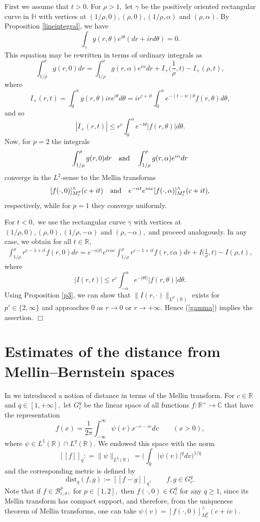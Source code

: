 \documentclass[amsmath,english,a4paper,graphicx,12pt]{article}
\begin{document}
First we assume that $t>0.$ For $\rho >1,$ let $\gamma$ be the positively oriented rectangular curve in $\mathbb{H}$ with vertices at 
$(1/\rho, 0), (\rho, 0), (1/\rho, \alpha)$ and $(\rho, \alpha).$ By Proposition \ref{lineintegral}, we have
$$\int_\gamma g(r,\theta) e^{i\theta}(dr + ird\theta) = 0.$$
This equation may be rewritten in terms of ordinary integrals as
$$\int_{1/\rho}^\rho g(r,0)dr = \int_{1/\rho}^\rho g(r,\alpha) e^{i\alpha}dr + I_+\bigg(\frac{1}{\rho}, t\bigg) - I_+(\rho, t),$$
where
$$I_+(r,t) = \int_0^\alpha g(r,\theta)i r e^{i\theta}d\theta = i r^{c+it}\int_0^\alpha e^{-(t-ic)\theta}f(r, \theta)d\theta,$$
and so 
$$|I_+(r,t)| \leq r^c\int_0^\alpha e^{-t \theta}|f(r,\theta)| d\theta.$$
Now, for $p=2$ the integrals
$$\int_{1/\rho}^\rho g(r,0)dr \quad\hbox{and} \quad \int_{1/\rho}^\rho g(r,\alpha) e^{i\alpha}dr$$
converge in the $L^2$-sense to the Mellin transforms 
$$[f(\cdot, 0)]^\wedge_{M^p_c}(c+it)  \quad \hbox{and} \quad 
e^{-\alpha t} e^{i \alpha c}[f(\cdot, \alpha)]^\wedge_{M^p_c}(c+it),$$ 
respectively, while for $p=1$ they converge uniformly.

 For $t<0,$ we use the rectangular curve $\gamma$ with vertices at $(1/\rho, 0), (\rho, 0), (1/\rho, -\alpha)$ and $(\rho, -\alpha),$ and 
proceed analogously. In any case, we obtain for all $t \in \mathbb{R},$
\begin{eqnarray}\label{gamma}
\int_{1/\rho}^{\rho} r^{c-1+it}f(r,0)dr = e^{-\alpha |t|} e^{i\varepsilon \alpha c}\int_{1/\rho}^\rho r^{c-1+it}f(r, \varepsilon \alpha) dr + 
I\bigg(\frac{1}{\rho}, t\bigg) - I(\rho, t),
\end{eqnarray}
where
$$|I(r,t)| \leq r^c\int_{-\alpha}^\alpha e^{-|\theta t|}|f(r, \theta)| d\theta.$$
Using Proposition \ref{p3}, we can show that $\|I(r, \cdot)\|_{L^{p'}(\mathbb{R})}$ exists for $p' \in \{2, \infty\}$ and approaches $0$ as 
$r \rightarrow 0$ or $r \rightarrow +\infty.$ Hence (\ref{gamma}) implies the assertion. \hfill $\Box$

\section{Estimates of the distance from Mellin--Bernstein spaces}

In \cite{BBMS2} we introduced a notion of distance in terms of the Mellin transform. For $c \in \mathbb{R}$ and $q \in [1, +\infty],$ let $G^q_c$ 
be the linear space of all functions $f:\mathbb{R}^+\rightarrow \mathbb{C}$ that have the representation
$$f(x) = \frac{1}{2\pi}\int_{-\infty}^\infty \psi(v) x^{-c-iv}dv \qquad (x>0),$$
where $\psi \in L^1(\mathbb{R})\cap L^q(\mathbb{R}).$ We endowed this space with the norm
$$[\!\![f]\!\!]_q : = \|\psi\|_{L^q(\mathbb{R})} = \bigg(\int_{\mathbb{R}}|\psi(v)|^qdv\bigg)^{1/q}$$
and the corresponding metric is defined by
$$\mbox{dist}_q(f,g) := [\!\![f-g]\!\!]_q, \qquad f,g \in G^q_c.$$
Note that if $f \in \mathscr{B}^p_{c,\sigma},$ for $p \in [1,2],$ then $f(\cdot, 0) \in G^q_c$ for any $q \geq 1$, since its 
Mellin transform has compact support, and therefore, from the uniqueness theorem of Mellin transforms, one can take $\psi (v)= [f(\cdot,0)]^\wedge_{M^p_c}(c+iv).$
\end{document}
